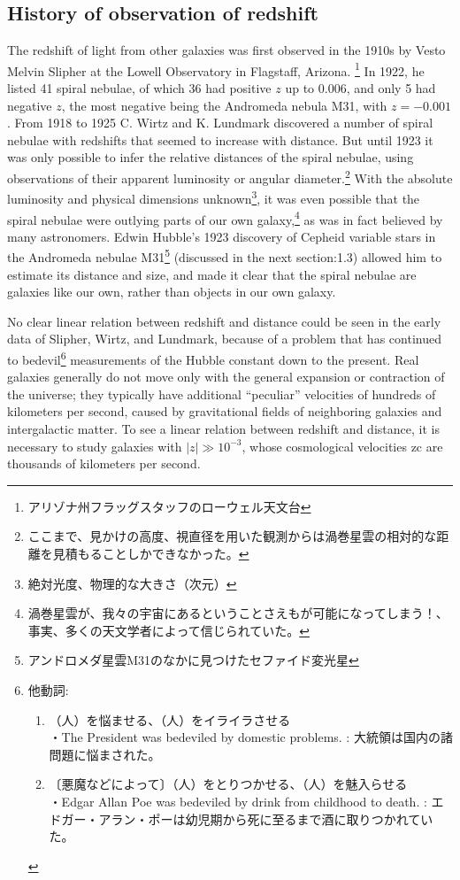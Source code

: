 \documentclass[11pt]{ltjsarticle}
\theoremstyle{plain}
\theoremstyle{break}
\begin{document}
\subsection{History of observation of redshift}
The redshift of light from other galaxies was first observed in the 1910s by Vesto Melvin Slipher at the Lowell Observatory in Flagstaff, Arizona.
\footnote{アリゾナ州フラッグスタッフのローウェル天文台}
In 1922, he listed 41 spiral nebulae, of which 36 had positive $z$ up to 0.006, and only 5 had negative $z$, the most negative being the Andromeda nebula M31, with $z = -0.001$.
From 1918 to 1925 C. Wirtz and K. Lundmark discovered a number of spiral nebulae with redshifts that seemed to increase with distance.
But until 1923 it was only possible to infer the relative distances of the spiral nebulae, using observations of their apparent luminosity or angular diameter.\footnote{ここまで、見かけの高度、視直径を用いた観測からは渦巻星雲の相対的な距離を見積もることしかできなかった。}
With the absolute luminosity and physical dimensions unknown\footnote{絶対光度、物理的な大きさ（次元）}, it was even possible that the spiral nebulae were outlying parts of our own galaxy,\footnote{渦巻星雲が、我々の宇宙にあるということさえもが可能になってしまう！、事実、多くの天文学者によって信じられていた。} as was in fact believed by many astronomers.
Edwin Hubble’s 1923 discovery of Cepheid variable stars in the Andromeda nebulae M31\footnote{アンドロメダ星雲M31のなかに見つけたセファイド変光星}
 (discussed in the next section:1.3) allowed him to estimate its distance and size, and made it clear that the spiral nebulae are galaxies like our own, rather than objects in our own galaxy.

 No clear linear relation between redshift and distance could be seen in the early data of Slipher, Wirtz, and Lundmark, because of a problem that has continued to bedevil\footnote{他動詞:
\begin{enumerate}
  \item （人）を悩ませる、（人）をイライラさせる\\
  ・The President was bedeviled by domestic problems. : 大統領は国内の諸問題に悩まされた。
 \item〔悪魔などによって〕（人）をとりつかせる、（人）を魅入らせる\\
 ・Edgar Allan Poe was bedeviled by drink from childhood to death. : エドガー・アラン・ポーは幼児期から死に至るまで酒に取りつかれていた。
\end{enumerate}
} measurements of the Hubble constant down to the present.
Real galaxies generally do not move only with the general expansion or contraction of the universe; they typically have additional “peculiar” velocities of hundreds of kilometers per second, caused by gravitational fields of neighboring galaxies and intergalactic matter.
To see a linear relation between redshift and distance, it is necessary to study galaxies with $|z| \gg 10^{-3}$, whose cosmological velocities zc are thousands of kilometers per second.
\end{document}
